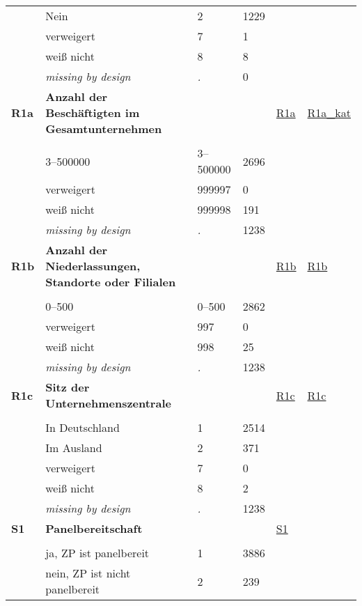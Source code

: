 \begin{longtable}{| L{2.45cm} | L{6cm} | C{1.5cm} | R{1cm} | C{2.25cm} | C{2.25cm} |}
   & Nein & 2 & 1229 &  &  \\ 
   & verweigert & 7 & 1 &  &  \\ 
   & weiß nicht & 8 & 8 &  &  \\ 
   & \textit{missing by design} & \textit{.} & 0 &  &  \\ 
   \midrule
\textbf{R1a}\label{var:R1a} & \textbf{Anzahl der Beschäftigten im Gesamtunternehmen} &  &  & \hyperref[R1a]{R1a} & \hyperref[var:suf:R1a:kat]{R1a\_kat} \\ 
   &  &  &  &  &  \\ 
   & 3--500000 & 3--500000 & 2696 &  &  \\ 
   & verweigert & 999997 & 0 &  &  \\ 
   & weiß nicht & 999998 & 191 &  &  \\ 
   & \textit{missing by design} & \textit{.} & 1238 &  &  \\ 
   \midrule
\textbf{R1b}\label{var:R1b} & \textbf{Anzahl der Niederlassungen, Standorte oder Filialen} &  &  & \hyperref[R1b]{R1b} & \hyperref[var:suf:R1b]{R1b} \\ 
   &  &  &  &  &  \\ 
   & 0--500 & 0--500 & 2862 &  &  \\ 
   & verweigert & 997 & 0 &  &  \\ 
   & weiß nicht & 998 & 25 &  &  \\ 
   & \textit{missing by design} & \textit{.} & 1238 &  &  \\ 
   \midrule
\textbf{R1c}\label{var:R1c} & \textbf{Sitz der Unternehmenszentrale} &  &  & \hyperref[R1c]{R1c} & \hyperref[var:suf:R1c]{R1c} \\ 
   &  &  &  &  &  \\ 
   & In Deutschland & 1 & 2514 &  &  \\ 
   & Im Ausland & 2 & 371 &  &  \\ 
   & verweigert & 7 & 0 &  &  \\ 
   & weiß nicht & 8 & 2 &  &  \\ 
   & \textit{missing by design} & \textit{.} & 1238 &  &  \\ 
   \midrule
\textbf{S1}\label{var:S1} & \textbf{Panelbereitschaft} &  &  & \hyperref[S1]{S1} & \hyperref[var:suf:]{} \\ 
   &  &  &  &  &  \\ 
   & ja, ZP ist panelbereit & 1 & 3886 &  &  \\ 
   & nein, ZP ist nicht panelbereit & 2 & 239 &  &  \\ 

\end{longtable}
